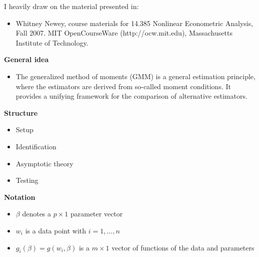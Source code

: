 \begin{frame} I heavily draw on the material presented in:

\begin{itemize}
\item Whitney Newey, course materials for 14.385 Nonlinear Econometric Analysis, Fall 2007. MIT OpenCourseWare
(http://ocw.mit.edu), Massachusetts Institute of Technology.
\end{itemize}

\end{frame}
\begin{frame}\textbf{General idea}\vspace{0.3cm}
\begin{itemize}\setlength\itemsep{1em}
\item The generalized method of moments (GMM) is a general estimation principle, where the estimators are derived from so-called  moment conditions. It provides a unifying framework for the comparison of alternative estimators.
\end{itemize}

\end{frame}
\begin{frame}\textbf{Structure}\vspace{0.3cm}

\begin{itemize}\setlength\itemsep{1em}
\item Setup
\item Identification
\item Asymptotic theory
\item Testing
\end{itemize}
\end{frame}
\begin{frame}\textbf{Notation}\vspace{0.3cm}

\begin{itemize}\setlength\itemsep{1em}
\item $\beta$ denotes a $p \times 1$ parameter vector
\item $w_i$ is a data point with $i = 1, \hdots, n$
\item $g_i(\beta) = g(w_i, \beta)$ is a $m \times 1$ vector of functions of the data and parameters
\end{itemize}
\end{frame}
